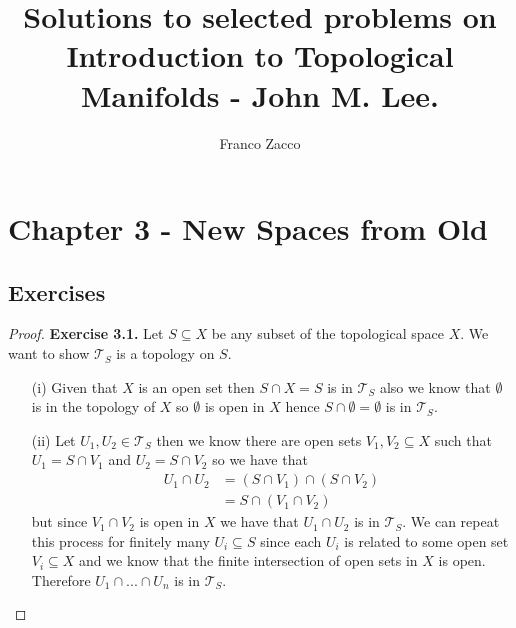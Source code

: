 \documentclass[11pt]{article}
\title{\textbf{Solutions to selected problems on Introduction to Topological Manifolds - John M. Lee.}}
\author{Franco Zacco}
\date{}
\newcommand{\Topo}{\mathcal{T}}
\theoremstyle{definition}
\begin{document}
\maketitle
\thispagestyle{empty}

\section*{Chapter 3 - New Spaces from Old}

\subsection*{Exercises}

\begin{proof}{\textbf{Exercise 3.1.}}
    Let $S \subseteq X$ be any subset of the topological space $X$.
    We want to show $\Topo_S$ is a topology on $S$.
    \begin{itemize}
    \item [(i)] Given that $X$ is an open set then $S \cap X = S$ is in
    $\Topo_S$ also we know that $\emptyset$ is in the topology of $X$ so
    $\emptyset$ is open in $X$ hence $S \cap \emptyset = \emptyset$ is in
    $\Topo_S$.
    
    \item [(ii)] Let $U_1, U_2 \in \Topo_S$ then we know there are open sets
    $V_1, V_2 \subseteq X$ such that $U_1 = S \cap V_1$ and $U_2 = S \cap V_2$
    so we have that
    \begin{align*}
        U_1 \cap U_2 &= (S \cap V_1) \cap (S \cap V_2)\\
            &= S \cap (V_1 \cap V_2)
    \end{align*}
    but since $V_1 \cap V_2$ is open in $X$ we have that $U_1 \cap U_2$ is
    in $\Topo_S$. We can repeat this process for finitely many $U_i \subseteq S$
    since each $U_i$ is related to some open set $V_i \subseteq X$ and we know
    that the finite intersection of open sets in $X$ is open. Therefore
    $U_1 \cap ... \cap U_n$ is in $\Topo_S$.


\end{itemize}
\end{proof}
\end{document}
